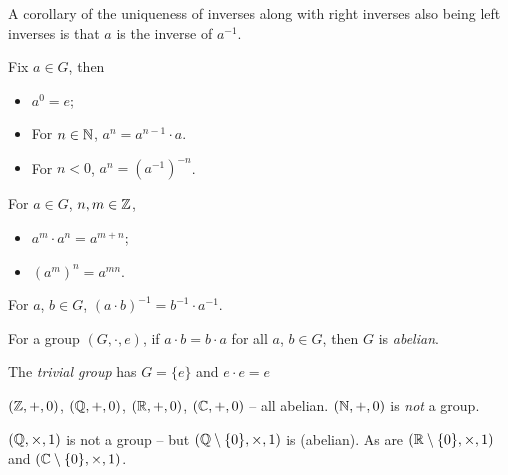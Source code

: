 \documentclass{../template/note}
\begin{document}
    A corollary of the uniqueness of inverses along with right inverses also being left inverses is that \(a\) is the inverse of \(a^{-1}\).

    \begin{definition}
        Fix \(a \in G\), then
        \begin{itemize}
            \item \(a^0 = e\);
            \item For \(n \in \mathbb N\), \(a^n = a^{n-1} \cdot a\).
            \item For \(n < 0\), \(a^n = (a^{-1})^{-n}\).
        \end{itemize}        
    \end{definition}
    
    \begin{proposition}
        For \(a \in G\), \(n, m \in \mathbb Z\),
        \begin{itemize}
            \item \(a^m \cdot a^n = a^{m+n}\);
            \item \((a^m)^n = a^{mn}\).
        \end{itemize}
    \end{proposition}
    
    \begin{proposition}
        For \(a\), \(b \in G\), \((a\cdot b)^{-1} = b^{-1}\cdot a^{-1}\).
    \end{proposition}
    
    \begin{definition}
        For a group \((G, \cdot, e)\), if \(a \cdot b = b \cdot a\) for all \(a\), \(b \in G\), then \(G\) is \emph{abelian}.
    \end{definition}
    
    \begin{example*}
        The \emph{trivial group} has \(G = \{e\}\) and \(e \cdot e = e\)
    \end{example*}
    
    

    \begin{example*}
        \((\mathbb Z, +, 0)\), \((\mathbb Q, +, 0)\), \((\mathbb R, +, 0)\), \((\mathbb C, +, 0)\) -- all abelian. \((\mathbb N, +, 0)\) is \emph{not} a group.
    \end{example*}

    \begin{example*}
        \((\mathbb Q, \times, 1)\) is not a group -- but \((\mathbb Q \setminus \{0\}, \times, 1)\) is (abelian). As are \((\mathbb R \setminus \{0\}, \times, 1)\) and \((\mathbb C \setminus \{0\}, \times, 1)\).
    \end{example*}
    
\end{document}
